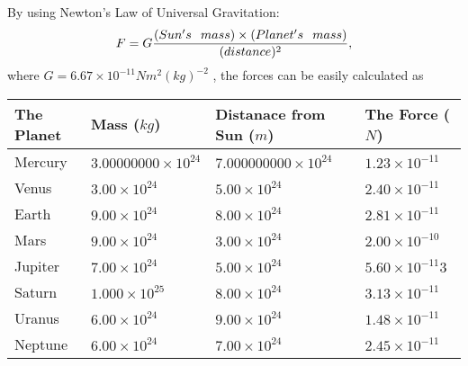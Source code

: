 \documentclass[12pt]{article}
\begin{document}
 

 
 
 
 
\noindent{}
 
 

By using Newton's Law of Universal Gravitation:
\[
F=G \frac{(Sun's \hspace{0.1in} mass) \times (Planet's \hspace{0.1in} mass)} { (distance)^2},
\]
where
$ G= %
6.67 \times 10^{-11} N m^{2}(kg)^{-2}$ , the forces can be easily calculated as
 
\vspace{0.2in}
 
 
\begin{tabular}{|l|l|l|l|}
\hline
The Planet & Mass ($kg$) & Distanace from Sun ($m$) & The Force ($N$)\\
\hline
Mercury  &
           $ %
3.00000000 \times 10^{24}  $   &
             $ %
7.000000000 \times 10^{24}$    & $ %
1.23 \times 10^{-11} $
\\  \hline
Venus    &
           $  %
3.00 \times 10^{24}  $     &
             $ %
5.00 \times 10^{24} $    & $ %
2.40 \times 10^{-11} $
\\  \hline
Earth    &
           $  %
9.00 \times 10^{24}$     &
             $ %
8.00 \times 10^{24} $    & $ %
2.81 \times 10^{-11} $
\\   \hline
Mars     &
           $  %
9.00 \times 10^{24} $     &
             $ %
3.00 \times 10^{24}$    & $ %
2.00 \times 10^{-10} $
\\   \hline
Jupiter  &
           $  %
7.00 \times 10^{24}  $    &
             $ %
5.00 \times 10^{24} $    & $ %
5.60 \times 10^{-11}3 $
\\  \hline
Saturn   &
           $  %
1.000 \times 10^{25}   $    &
             $ %
8.00 \times 10^{24}  $    & $ %
3.13 \times 10^{-11} $
\\  \hline
Uranus   &
           $  %
6.00 \times 10^{24} $    &
             $ %
9.00 \times 10^{24}$    & $ %
1.48 \times 10^{-11} $
\\  \hline
Neptune  &
           $  %
6.00 \times 10^{24}  $    &
             $ %
7.00 \times 10^{24} $    & $ %
2.45 \times 10^{-11} $
\\  \hline
 
\end{tabular}
 
 
 
 
\noindent{}
 
\end{document}
